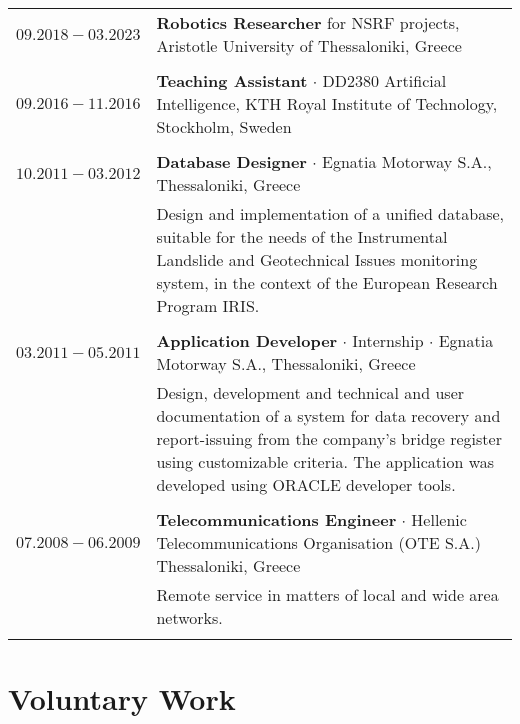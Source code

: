 \documentclass[a4paper,10pt,twoside]{article}
\begin{document}
\begin{tabular}{rp{11cm}}
$09.2018 - 03.2023$ & \textbf{Robotics Researcher} for NSRF projects, Aristotle University of Thessaloniki, Greece\\
&\\
$09.2016 - 11.2016$ & \textbf{Teaching Assistant} $\cdot$ DD2380 Artificial Intelligence, KTH Royal Institute of Technology, Stockholm, Sweden\\
&\\

$10.2011 - 03.2012$ & \textbf{Database Designer}  $\cdot$ Egnatia Motorway S.A., Thessaloniki, Greece \\
& \small{Design and implementation of a unified database, suitable for the needs of the
Instrumental Landslide and Geotechnical Issues
monitoring system, in the context of the European Research Program IRIS.
}\\
\multicolumn{2}{c}{} \\


$03.2011 - 05.2011$ & \textbf{Application Developer}  $\cdot$ Internship $\cdot$ Egnatia Motorway S.A., Thessaloniki, Greece\\
& \small{Design, development and technical and user documentation of a system for data
recovery and report-issuing from the company's bridge register using
customizable criteria. The application was developed using ORACLE developer tools.
}\\
\multicolumn{2}{c}{} \\


$07.2008 - 06.2009$ & \textbf{Telecommunications Engineer}  $\cdot$ Hellenic Telecommunications
Organisation (OTE S.A.) Thessaloniki, Greece\\
& \small{Remote service in matters of local and wide area networks.
}\\
&\\
\end{tabular}



\section{Voluntary Work}
\end{document}

